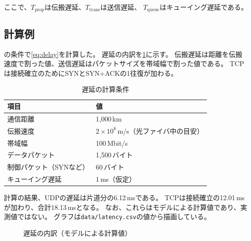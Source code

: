 ここで、$T_{\mathrm{prop}}$は伝搬遅延、$T_{\mathrm{trans}}$は送信遅延、
$T_{\mathrm{queue}}$はキューイング遅延である。

\subsection{計算例}
\label{sec:latency}

の条件で\cref{eq:delay}を計算した。
遅延の内訳を\cref{fig:latency}に示す。
伝搬遅延は距離を伝搬速度で割った値、送信遅延はパケットサイズを帯域幅で割った値である。
TCPは接続確立のためにSYNとSYN+ACKの1往復が加わる。

\begin{table}[htbp]
\centering
\caption{遅延の計算条件}
\label{tab:conditions}
\begin{tabular}{ll}
\toprule
項目 & 値 \\
\midrule
通信距離 & 1{,}000\,km \\
伝搬速度 & $2 \times 10^{8}$\,m/s（光ファイバ中の目安） \\
帯域幅 & 100\,Mbit/s \\
データパケット & 1{,}500\,バイト \\
制御パケット（SYNなど） & 60\,バイト \\
キューイング遅延 & 1\,ms（仮定） \\
\bottomrule
\end{tabular}
\end{table}

計算の結果、UDPの遅延は片道分の6.12\,msである。
TCPは接続確立の12.01\,msが加わり、合計18.13\,msとなる。
なお、これらはモデルによる計算値であり、実測値ではない。
グラフは\texttt{data/latency.csv}の値から描画している。

\begin{figure}[htbp]
\centering

\caption{遅延の内訳（モデルによる計算値）}
\label{fig:latency}
\end{figure}
